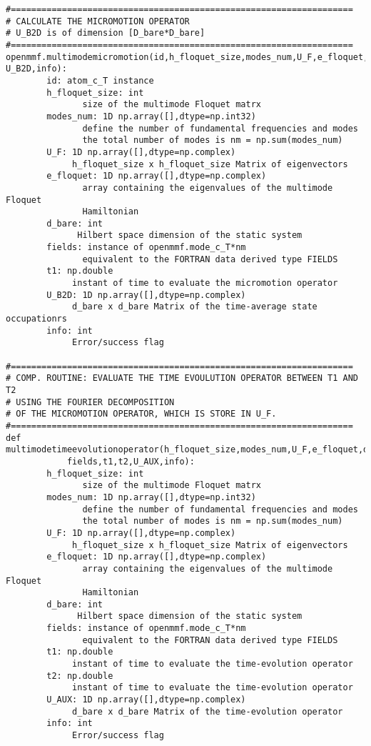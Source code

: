 \documentclass[10pt,a4paper]{article}
\begin{document}
\begin{verbatim}
#===================================================================
# CALCULATE THE MICROMOTION OPERATOR
# U_B2D is of dimension [D_bare*D_bare]
#===================================================================
openmmf.multimodemicromotion(id,h_floquet_size,modes_num,U_F,e_floquet,d_bare,fields,t1, U_B2D,info):
        id: atom_c_T instance
        h_floquet_size: int
               size of the multimode Floquet matrx
        modes_num: 1D np.array([],dtype=np.int32)
               define the number of fundamental frequencies and modes
               the total number of modes is nm = np.sum(modes_num)
        U_F: 1D np.array([],dtype=np.complex)
             h_floquet_size x h_floquet_size Matrix of eigenvectors            
        e_floquet: 1D np.array([],dtype=np.complex)
               array containing the eigenvalues of the multimode Floquet
               Hamiltonian
        d_bare: int
              Hilbert space dimension of the static system
        fields: instance of openmmf.mode_c_T*nm 
               equivalent to the FORTRAN data derived type FIELDS
        t1: np.double
             instant of time to evaluate the micromotion operator
        U_B2D: 1D np.array([],dtype=np.complex)
             d_bare x d_bare Matrix of the time-average state occupationrs                          
        info: int
             Error/success flag

#===================================================================
# COMP. ROUTINE: EVALUATE THE TIME EVOULUTION OPERATOR BETWEEN T1 AND T2 
# USING THE FOURIER DECOMPOSITION
# OF THE MICROMOTION OPERATOR, WHICH IS STORE IN U_F.
#===================================================================
def multimodetimeevolutionoperator(h_floquet_size,modes_num,U_F,e_floquet,d_bare,
            fields,t1,t2,U_AUX,info):
        h_floquet_size: int
               size of the multimode Floquet matrx
        modes_num: 1D np.array([],dtype=np.int32)
               define the number of fundamental frequencies and modes
               the total number of modes is nm = np.sum(modes_num)
        U_F: 1D np.array([],dtype=np.complex)
             h_floquet_size x h_floquet_size Matrix of eigenvectors            
        e_floquet: 1D np.array([],dtype=np.complex)
               array containing the eigenvalues of the multimode Floquet
               Hamiltonian
        d_bare: int
              Hilbert space dimension of the static system
        fields: instance of openmmf.mode_c_T*nm 
               equivalent to the FORTRAN data derived type FIELDS
        t1: np.double
             instant of time to evaluate the time-evolution operator
        t2: np.double
             instant of time to evaluate the time-evolution operator
        U_AUX: 1D np.array([],dtype=np.complex)
             d_bare x d_bare Matrix of the time-evolution operator
        info: int
             Error/success flag



\end{verbatim}
\end{document}
